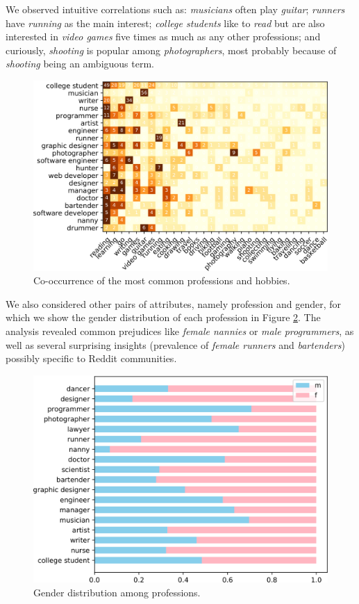 We observed intuitive correlations such as:
\emph{musicians} often play \emph{guitar};
\emph{runners} have \emph{running} as the main interest; 
\emph{college students} like to \emph{read} but are also interested in \emph{video games} five times as much as any other professions;
and curiously, \emph{shooting} is popular among \emph{photographers}, most probably because of \textit{shooting} being an ambiguous term.

\begin{figure}[]
  \centering
  \includegraphics[width=0.77\linewidth]{pics/hob_prof.png}
  \caption{Co-occurrence of the most common professions and hobbies.}
  \label{prof-hob}
\end{figure}

We also considered other pairs of attributes, namely profession and gender, for which we show the gender distribution of each profession in Figure \ref{prof_gender}. 
The analysis revealed common prejudices like \emph{female nannies} or \emph{male programmers},  
as well as several surprising insights (prevalence of \textit{female runners} and \textit{bartenders}) possibly specific to Reddit communities.

\begin{figure}[]
\centering
\includegraphics[width=0.67\linewidth]{pics/prof_gend.png}
\caption{Gender distribution among professions.}
\label{prof_gender}
\end{figure}